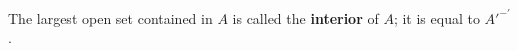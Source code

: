 The largest open set contained in $A$ is called the \textbf{interior} of $A$; it is equal to $A'^{-'}$.
